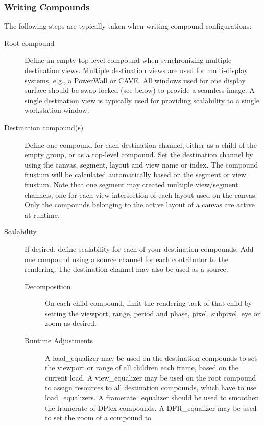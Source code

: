 \documentclass[10pt,a4]{scrartcl}
\begin{document}
\subsubsection{Writing Compounds}
The following steps are typically taken when writing compound
configurations:
\begin{description}
\item [Root compound] Define an empty top-level compound when
  synchronizing multiple destination views. Multiple destination views
  are used for multi-display systems, e.g., a PowerWall or CAVE. All
  windows used for one display surface should be swap-locked (see below)
  to provide a seamless image. A single destination view is typically
  used for providing scalability to a single workstation window.
\item [Destination compound(s)] Define one compound for each destination
  channel, either as a child of the empty group, or as a top-level compound. Set
  the destination channel by using the canvas, segment, layout and view name or
  index. The compound frustum will be calculated automatically based on the
  segment or view frustum. Note that one segment may created multiple
  view/segment channels, one for each view intersection of each layout used on
  the canvas. Only the compounds belonging to the active layout of a canvas are
  active at runtime.
\item[Scalability] If desired, define scalability for each of your
  destination compounds. Add one compound using a source channel for
  each contributor to the rendering. The destination channel may also be
  used as a source. 
  \begin{description}
  \item[Decomposition] On each child compound, limit the rendering task of that
    child by setting the \textsf{viewport}, \textsf{range}, \textsf{period} and
    \textsf{phase}, \textsf{pixel}, \textsf{subpixel}, \textsf{eye} or
    \textsf{zoom} as desired.
  \item[Runtime Adjustments] A \textsf{load\_equalizer} may be used on
    the destination compounds to set the \textsf{viewport} or
    \textsf{range} of all children each frame, based on the current
    load. A \textsf{view\_equalizer} may be used on the root compound to
    assign resources to all destination compounds, which have to use
    \textsf{load\_equalizer}s. A \textsf{framerate\_equalizer} should be
    used to smoothen the framerate of DPlex compounds. A
    \textsf{DFR\_equalizer} may be used to set the zoom of a compound to

\end{description}
\end{description}
\end{document}
